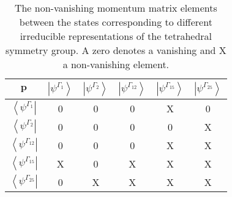 \begin{table}
\begin{centering}
\begin{tabular}{cccccc}
\toprule 
$\mathbf{p}$ & $\left|\psi^{\Gamma_{1}}\right\rangle $ & $\left|\psi^{\Gamma_{2}}\right\rangle $ & $\left|\psi^{\Gamma_{12}}\right\rangle $ & $\left|\psi^{\Gamma_{15}}\right\rangle $ & $\left|\psi^{\Gamma_{25}}\right\rangle $\tabularnewline
\midrule
\midrule 
$\left\langle \psi^{\Gamma_{1}}\right|$ & 0 & 0 & 0 & X & 0\tabularnewline
\midrule 
$\left\langle \psi^{\Gamma_{2}}\right|$ & 0 & 0 & 0 & 0 & X\tabularnewline
\midrule 
$\left\langle \psi^{\Gamma_{12}}\right|$ & 0 & 0 & 0 & X & X\tabularnewline
\midrule 
$\left\langle \psi^{\Gamma_{15}}\right|$ & X & 0 & X & X & X\tabularnewline
\midrule 
$\left\langle \psi^{\Gamma_{25}}\right|$ & 0 & X & X & X & X\tabularnewline
\bottomrule
\end{tabular}
\par\end{centering}

\caption{\label{tab:The_non_vanishing_momentum_elements_Td}The non-vanishing
momentum matrix elements between the states corresponding to different
irreducible representations of the tetrahedral symmetry group. A zero
denotes a vanishing and X a non-vanishing element.}

\end{table}

